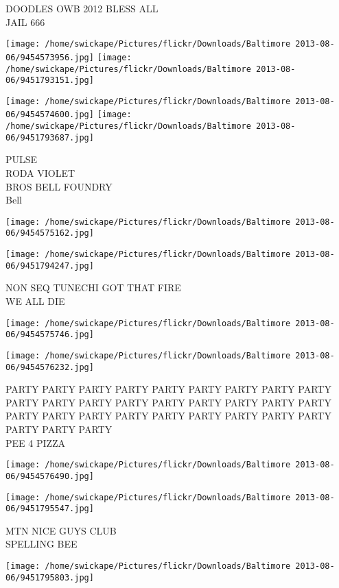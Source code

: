 \documentclass[10pt,letterpaper]{article}
\begin{document}
DOODLES OWB 2012 BLESS ALL\\
JAIL 666
\pagebreak

\texttt{[image: /home/swickape/Pictures/flickr/Downloads/Baltimore 2013-08-06/9454573956.jpg]}
\texttt{[image: /home/swickape/Pictures/flickr/Downloads/Baltimore 2013-08-06/9451793151.jpg]}

\texttt{[image: /home/swickape/Pictures/flickr/Downloads/Baltimore 2013-08-06/9454574600.jpg]}
\texttt{[image: /home/swickape/Pictures/flickr/Downloads/Baltimore 2013-08-06/9451793687.jpg]}

PULSE\\
RODA VIOLET\\
BROS BELL FOUNDRY\\
Bell
\pagebreak

\texttt{[image: /home/swickape/Pictures/flickr/Downloads/Baltimore 2013-08-06/9454575162.jpg]}

\vspace{0.25in}
\texttt{[image: /home/swickape/Pictures/flickr/Downloads/Baltimore 2013-08-06/9451794247.jpg]}

NON SEQ TUNECHI GOT THAT FIRE\\
WE ALL DIE
\pagebreak

\texttt{[image: /home/swickape/Pictures/flickr/Downloads/Baltimore 2013-08-06/9454575746.jpg]}

\vspace{0.25in}
\texttt{[image: /home/swickape/Pictures/flickr/Downloads/Baltimore 2013-08-06/9454576232.jpg]}

PARTY PARTY PARTY PARTY PARTY PARTY PARTY PARTY PARTY PARTY PARTY PARTY PARTY PARTY PARTY PARTY PARTY PARTY PARTY PARTY PARTY PARTY PARTY PARTY PARTY PARTY PARTY PARTY PARTY PARTY\\
PEE 4 PIZZA
\pagebreak

\texttt{[image: /home/swickape/Pictures/flickr/Downloads/Baltimore 2013-08-06/9454576490.jpg]}

\vspace{0.25in}
\texttt{[image: /home/swickape/Pictures/flickr/Downloads/Baltimore 2013-08-06/9451795547.jpg]}

MTN NICE GUYS CLUB\\
SPELLING BEE
\pagebreak

\texttt{[image: /home/swickape/Pictures/flickr/Downloads/Baltimore 2013-08-06/9451795803.jpg]}
\end{document}
